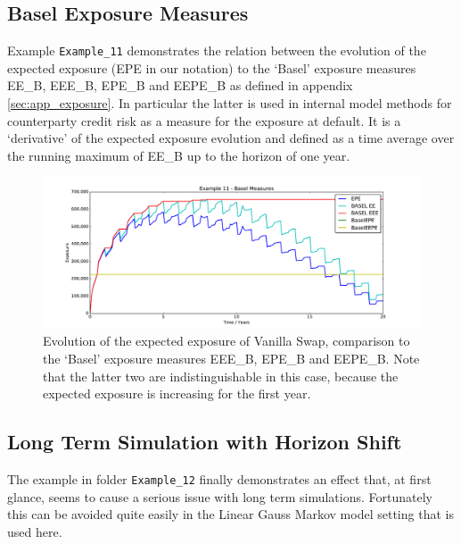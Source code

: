 \documentclass[12pt, a4paper]{article}
\begin{document}
{%
\subsection{Basel Exposure Measures}\label{sec:basel}

Example {\tt Example\_11} demonstrates the relation between the evolution of the expected exposure (EPE in our notation)
to the `Basel' exposure measures EE\_B, EEE\_B, EPE\_B and EEPE\_B as defined in appendix \ref{sec:app_exposure}. In
particular the latter is used in internal model methods for counterparty credit risk as a measure for the exposure at
default. It is a `derivative' of the expected exposure evolution and defined as a time average over the running maximum
of EE\_B up to the horizon of one year.
\begin{figure}[h!]
\begin{center}
\includegraphics[scale=0.45]{mpl_basel_exposures.pdf}
\end{center}
\caption{Evolution of the expected exposure of Vanilla Swap, comparison to the `Basel' exposure measures EEE\_B, EPE\_B and EEPE\_B. Note that the latter two are indistinguishable in this case, because the expected exposure is increasing for the first year.}
\label{fig_14}
\end{figure}

\subsection{Long Term Simulation with Horizon Shift}\label{sec:longterm}

The example in folder {\tt Example\_12} finally demonstrates an effect that, at first glance, seems to cause a serious
issue with long term simulations. Fortunately this can be avoided quite easily in the Linear Gauss Markov model setting
that is used here. \\

}
\end{document}
